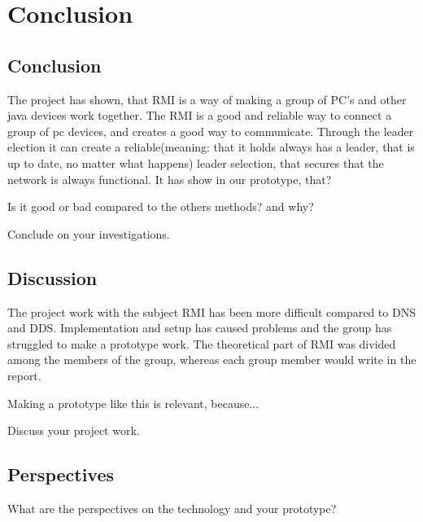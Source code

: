 \chapter{Conclusion}
\section{Conclusion}

The project has shown, that RMI is a way of making a group of PC's and other java devices work together. 
The RMI is a good and reliable way to connect a group of pc devices, and creates a good way to communicate. Through the leader election it can create a reliable(meaning: that it holds always has a leader, that is up to date, no matter what happens) leader selection, that secures that the network is always functional.
It has show in our prototype, that?

Is it good or bad compared to the others methods? and why?

Conclude on your investigations.
\section{Discussion}
The project work with the subject RMI has been more difficult compared to DNS and DDS.
Implementation and setup has caused problems and the group has struggled to make a prototype work.
The theoretical part of RMI was divided among the members of the group, whereas each group member would write in the report.

Making a prototype like this is relevant, because...

Discuss your project work.

\section{Perspectives}
What are the perspectives on the technology and your prototype? 